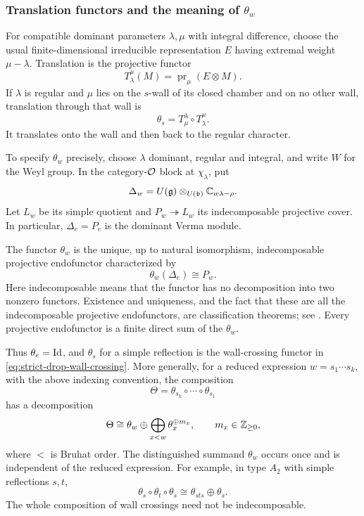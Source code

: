 \subsubsection{Translation functors and the meaning of \texorpdfstring{$\theta_w$}{theta-w}}

For compatible dominant parameters $\lambda,\mu$ with integral difference,
choose the usual finite-dimensional irreducible representation $E$ having
extremal weight $\mu-\lambda$. Translation is the projective functor
\[
  T_\lambda^\mu(M)=\operatorname{pr}_\mu(E\otimes M).
\]
If $\lambda$ is regular and $\mu$ lies on the $s$-wall of its closed
chamber and on no other wall, translation through that wall is
\begin{equation}\label{eq:strict-drop-wall-crossing}
  \theta_s=T_\mu^\lambda\circ T_\lambda^\mu.
\end{equation}
It translates onto the wall and then back to the regular character.

To specify $\theta_w$ precisely, choose $\lambda$ dominant, regular and
integral, and write $W$ for the Weyl group. In the category-$\mathcal{O}$ block at
$\chi_\lambda$, put
\[
  \Delta_w=U(\mathfrak{g})\otimes_{U(\mathfrak{b})}\mathbb{C}_{w\lambda-\rho}.
\]
Let $L_w$ be its simple quotient and $P_w\twoheadrightarrow L_w$ its
indecomposable projective cover. In particular, $\Delta_e=P_e$ is the
dominant Verma module.

\begin{notn}\label{notn:strict-drop-theta-w}
The functor $\theta_w$ is the unique, up to natural isomorphism,
indecomposable projective endofunctor characterized by
\begin{equation}\label{eq:strict-drop-theta-characterization}
  \boxed{\theta_w(\Delta_e)\cong P_w.}
\end{equation}
Here indecomposable means that the functor has no decomposition into two
nonzero functors. Existence and uniqueness, and the fact that these are all
the indecomposable projective endofunctors, are classification theorems;
see \cite[\S2.2]{MackaayMazorchukMiemietz2024}. Every projective
endofunctor is a finite direct sum of the $\theta_w$.
\end{notn}

Thus $\theta_e=\operatorname{Id}$, and $\theta_s$ for a simple reflection is the
wall-crossing functor in \eqref{eq:strict-drop-wall-crossing}. More
generally, for a reduced expression $w=s_1\cdots s_k$, with the above
indexing convention, the composition
\[
  \Theta=\theta_{s_k}\circ\cdots\circ\theta_{s_1}
\]
has a decomposition
\begin{equation}\label{eq:strict-drop-bott-samelson}
  \Theta\cong\theta_w\oplus
       \bigoplus_{x<w}\theta_x^{\oplus m_x},
  \qquad m_x\in\mathbb{Z}_{\geq0},
\end{equation}
where $<$ is Bruhat order. The distinguished summand $\theta_w$ occurs
once and is independent of the reduced expression. For example, in type
$A_2$ with simple reflections $s,t$,
\[
  \theta_s\circ\theta_t\circ\theta_s
  \cong\theta_{sts}\oplus\theta_s.
\]
The whole composition of wall crossings need not be indecomposable.

